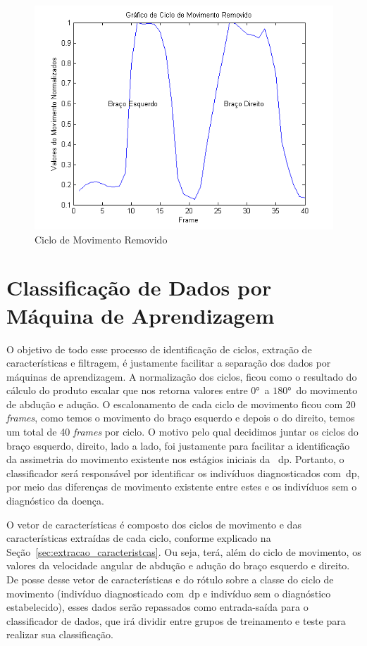 \begin{figure}[!htb]
     \centering
     \includegraphics[width=1\textwidth]{./img/ciclomovimentoremovido.png}
     \caption{Ciclo de Movimento Removido}
		 \label{img:ciclo_filtrado}
\end{figure}


\section{Classificação de Dados por Máquina de Aprendizagem}\label{section:class_dados}
O objetivo de todo esse processo de identificação de ciclos, extração de características e filtragem, é justamente facilitar a separação dos dados por máquinas de aprendizagem. A normalização dos ciclos, ficou como o resultado do cálculo do produto escalar que nos retorna valores entre $ 0° $\ a $ 180° $\, do movimento de abdução e adução. O escalonamento de cada ciclo de movimento ficou com 20 \textit{frames}, como temos o movimento do braço esquerdo e depois o do direito, temos um total de 40 \textit{frames} por ciclo. O motivo pelo qual decidimos juntar os ciclos do braço esquerdo, direito, lado a lado, foi justamente para facilitar a identificação da assimetria do movimento existente nos estágios iniciais da ~\ac{dp}. Portanto, o classificador será responsável por identificar os indivíduos diagnosticados com~\ac{dp}, por meio das diferenças de movimento existente entre estes e os indivíduos sem o diagnóstico da doença. 

O vetor de características é composto dos ciclos de movimento e das características extraídas de cada ciclo, conforme explicado na Seção~\ref{sec:extracao_caracteristcas}. Ou seja, terá, além do ciclo de movimento, os valores da velocidade angular de abdução e adução do braço esquerdo e direito. De posse desse vetor de características e do rótulo sobre a classe do ciclo de movimento (indivíduo diagnosticado com~\ac{dp} e indivíduo sem o diagnóstico estabelecido), esses dados serão repassados como entrada-saída para o classificador de dados, que irá dividir entre grupos de treinamento e teste para realizar sua classificação.

